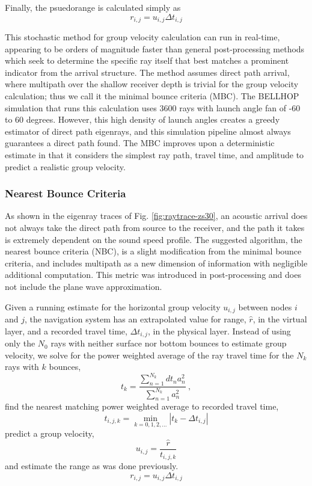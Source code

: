 Finally, the psuedorange is calculated simply as
\begin{equation}
r_{i,j} = u_{i,j} \Delta t_{i,j} 
\end{equation}

This stochastic method for group velocity calculation can run in real-time, appearing to be orders of magnitude faster than general post-processing methods which seek to determine the specific ray itself that best matches a prominent indicator from the arrival structure.
The method assumes direct path arrival, where multipath over the shallow receiver depth is trivial for the group velocity calculation; thus we call it the minimal bounce criteria (MBC).
The BELLHOP simulation that runs this calculation uses 3600 rays with launch angle fan of -60 to 60 degrees.
However, this high density of launch angles creates a greedy estimator of direct path eigenrays, and this simulation pipeline almost always guarantees a direct path found.
The MBC improves upon a deterministic estimate in that it considers the simplest ray path, travel time, and amplitude to predict a realistic group velocity.

\subsubsection{Nearest Bounce Criteria}

As shown in the eigenray traces of Fig. \ref{fig:raytrace-zs30}, an acoustic arrival does not always take the direct path from source to the receiver, and the path it takes is extremely dependent on the sound speed profile.
The suggested algorithm, the nearest bounce criteria (NBC), is a slight modification from the minimal bounce criteria, and includes multipath as a new dimension of information with negligible additional computation.
This metric was introduced in post-processing and does not include the plane wave approximation.

Given a running estimate for the horizontal group velocity $u_{i,j}$ between nodes $i$ and $j$, the navigation system has an extrapolated value for range, $\hat{r}$, in the virtual layer, and a recorded travel time, $\Delta t_{i,j}$, in the physical layer.
Instead of using only the $N_0$ rays with neither surface nor bottom bounces to estimate group velocity, we solve for the power weighted average of the ray travel time for the $N_k$ rays with $k$ bounces,
\begin{equation}
t_k = \frac{\sum_{n=1}^{N_{k}} dt_{n}a_{n}^{2}}{\sum_{n=1}^{N_{k}} a_{n}^{2}} ~, 
\end{equation}
find the nearest matching power weighted average to recorded travel time,
\begin{equation}
t_{i,j,k} = \min_{k=0,1,2,...} \left| t_k - \Delta t_{i,j} \right|
\end{equation}
predict a group velocity,
\begin{equation}
u_{i,j} = \dfrac{\hat{r}}{t_{i,j,k}}
\end{equation}
and estimate the range as was done previously.
\begin{equation}
r_{i,j} = u_{i,j}\Delta t_{i,j}
\end{equation}


